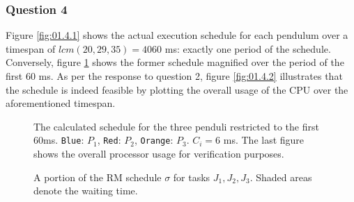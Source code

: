\subsubsection{Question 4}

Figure \ref{fig:01.4.1} shows the actual execution schedule for each pendulum
over a timespan of $lcm(20,29,35) = 4060$ ms: exactly one period of the schedule.
Conversely, figure \ref{fig:01.4.1.small} shows the former schedule magnified
over the period of the first 60 ms.
As per the response to question 2, figure \ref{fig:01.4.2} illustrates that the
schedule is indeed feasible by plotting the overall usage of the CPU over the
aforementioned timespan.

\begin{sidewaysfigure}
  \begin{figure}[H]\centering
    \scalebox{1}{}
    \caption{The calculated schedule for the three penduli restricted to the first
      60ms. \texttt{Blue}: $P_1$, \texttt{Red}: $P_2$,
      \texttt{Orange}: $P_3$. $C_i = 6$ ms. The last figure shows the overall
      processor usage for verification purposes.}
    \label{fig:01.4.1.small}
  \end{figure}

  \begin{figure}[H]\centering
    \scalebox{0.7}{}
    \caption{A portion of the RM schedule $\sigma$ for tasks $J_1, J_2, J_3$.
      Shaded areas denote the waiting time.}
    \label{fig:rm_6}
  \end{figure}
\end{sidewaysfigure}

\noindent{}

